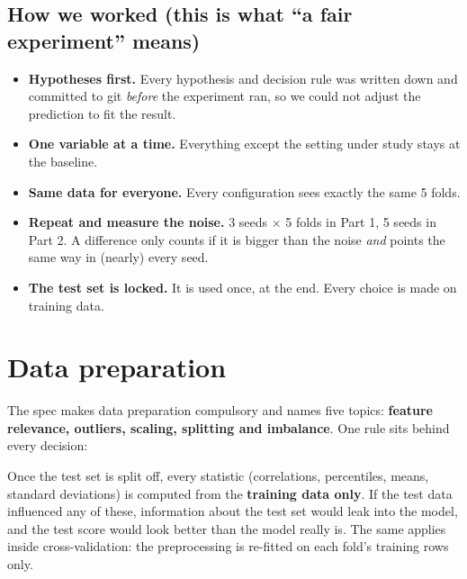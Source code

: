\documentclass[11pt,a4paper]{article}
\begin{document}
\subsection*{How we worked (this is what ``a fair experiment'' means)}
\begin{itemize}
  \item \textbf{Hypotheses first.} Every hypothesis and decision rule was written down and committed to git
        \emph{before} the experiment ran, so we could not adjust the prediction to fit the result.
  \item \textbf{One variable at a time.} Everything except the setting under study stays at the baseline.
  \item \textbf{Same data for everyone.} Every configuration sees exactly the same 5 folds.
  \item \textbf{Repeat and measure the noise.} 3 seeds $\times$ 5 folds in Part 1, 5 seeds in Part 2. A difference only
        counts if it is bigger than the noise \emph{and} points the same way in (nearly) every seed.
  \item \textbf{The test set is locked.} It is used once, at the end. Every choice is made on training data.
\end{itemize}

\newpage
\section{Data preparation}
\label{sec:data}

The spec makes data preparation compulsory and names five topics: \textbf{feature relevance, outliers, scaling,
splitting and imbalance}. One rule sits behind every decision:

\begin{keyidea}
Once the test set is split off, every statistic (correlations, percentiles, means, standard deviations) is computed
from the \textbf{training data only}. If the test data influenced any of these, information about the test set would
leak into the model, and the test score would look better than the model really is. The same applies inside
cross-validation: the preprocessing is re-fitted on each fold's training rows only.
\end{keyidea}
\end{document}
